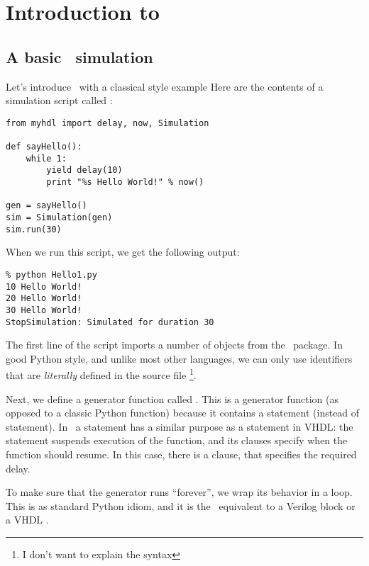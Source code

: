 \chapter{Introduction to \myhdl\ }

\section{A basic \myhdl\ simulation}

Let's introduce \myhdl\ with a classical  style
example Here are the contents of a simulation script called
:

\begin{verbatim}
from myhdl import delay, now, Simulation

def sayHello():
    while 1:
        yield delay(10)
        print "%s Hello World!" % now()

gen = sayHello()
sim = Simulation(gen)
sim.run(30)

\end{verbatim}

When we run this script, we get the following output: 

\begin{verbatim}
% python Hello1.py
10 Hello World!
20 Hello World!
30 Hello World!
StopSimulation: Simulated for duration 30

\end{verbatim}

The first line of the script imports a
number of objects from the \myhdl\ package. In good Python style, and
unlike most other languages, we can only use identifiers that are
\emph{literally} defined in the source file \footnote{I don't want to
explain the  syntax}.

Next, we define a generator function called
. This is a generator function (as opposed to
a classic Python function) because it contains a 
statement (instead of  statement). In \myhdl\, a
 statement has a similar purpose as a 
statement in VHDL: the statement suspends execution of the function,
and its clauses specify when the function should resume. In this case,
there is a  clause, that specifies the required delay.

To make sure that the generator runs ``forever'', we wrap its behavior
in a  loop. This is as standard Python idiom, and it is
the \myhdl\ equivalent to a Verilog  block or a
VHDL .

